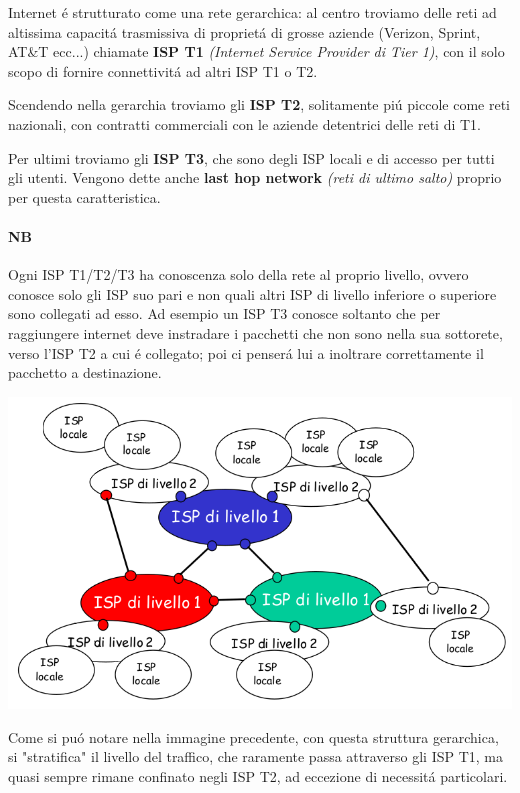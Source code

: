 \documentclass[12pt]{article}
\begin{document}
Internet \'e strutturato come una rete gerarchica: al centro troviamo delle reti ad altissima capacit\'a trasmissiva di propriet\'a 
di grosse aziende (Verizon, Sprint, AT\&T ecc...) chiamate \textbf{ISP T1} \textit{(Internet Service Provider di Tier 1)}, con il 
solo scopo di fornire connettivit\'a ad altri ISP T1 o T2. 

Scendendo nella gerarchia troviamo gli \textbf{ISP T2}, solitamente pi\'u piccole come reti nazionali, con contratti commerciali con 
le aziende detentrici delle reti di T1.

Per ultimi troviamo gli \textbf{ISP T3}, che sono degli ISP locali e di accesso per tutti gli utenti. Vengono dette anche 
\textbf{last hop network} \textit{(reti di ultimo salto)} proprio per questa caratteristica.

\paragraph{NB} Ogni ISP T1/T2/T3 ha conoscenza solo della rete al proprio livello, ovvero conosce solo gli ISP suo pari e non quali 
altri ISP di livello inferiore o superiore sono collegati ad esso. Ad esempio un ISP T3 conosce soltanto che per raggiungere 
internet deve instradare i pacchetti che non sono nella sua sottorete, verso l'ISP T2 a cui \'e collegato; poi ci penser\'a lui a 
inoltrare correttamente il pacchetto a destinazione.

\begin{center}
	\includegraphics[scale=0.6]{introduzione-img17.png}
\end{center}

Come si pu\'o notare nella immagine precedente, con questa struttura gerarchica, si "stratifica" il livello del traffico, che 
raramente passa attraverso gli ISP T1, ma quasi sempre rimane confinato negli ISP T2, ad eccezione di necessit\'a particolari.
\end{document}
